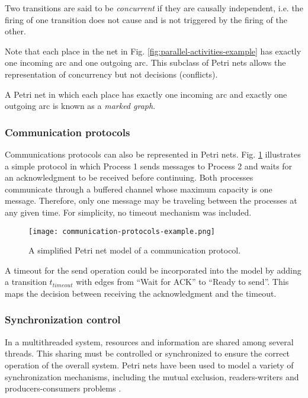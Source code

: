 \begin{definition}
    Two transitions are said to be \textit{concurrent} if they are causally independent, i.e.
    the firing of one transition does not cause and is not triggered by the firing of the other.
\end{definition}

Note that each place in the net in Fig. \ref{fig:parallel-activities-example} has exactly one incoming arc
and one outgoing arc.
This subclass of Petri nets allows the representation of concurrency but not decisions (conflicts).

\begin{definition}
    A Petri net in which each place has exactly one incoming arc
    and exactly one outgoing arc is known as a \textit{marked graph}.
\end{definition}

\subsubsection{Communication protocols}

Communications protocols can also be represented in Petri nets.
Fig. \ref{fig:communication-protocols-example} illustrates a simple protocol
in which Process 1 sends messages to Process 2 and waits for an acknowledgment to be received before continuing.
Both processes communicate through a buffered channel whose maximum capacity is one message.
Therefore, only one message may be traveling between the processes at any given time.
For simplicity, no timeout mechanism was included.

\begin{figure}[H]
    \centering
    \texttt{[image: communication-protocols-example.png]}
    \caption{A simplified Petri net model of a communication protocol.}
    \label{fig:communication-protocols-example}
\end{figure}

A timeout for the send operation could be incorporated into the model
by adding a transition $t_{timeout}$ with edges from ``Wait for ACK'' to ``Ready to send''.
This maps the decision between receiving the acknowledgment and the timeout.

\subsubsection{Synchronization control}

In a multithreaded system, resources and information are shared among several threads.
This sharing must be controlled or synchronized to ensure the correct operation of the overall system.
Petri nets have been used to model a variety of synchronization mechanisms,
including the mutual exclusion, readers-writers and producers-consumers problems \cite{murata1989}.

